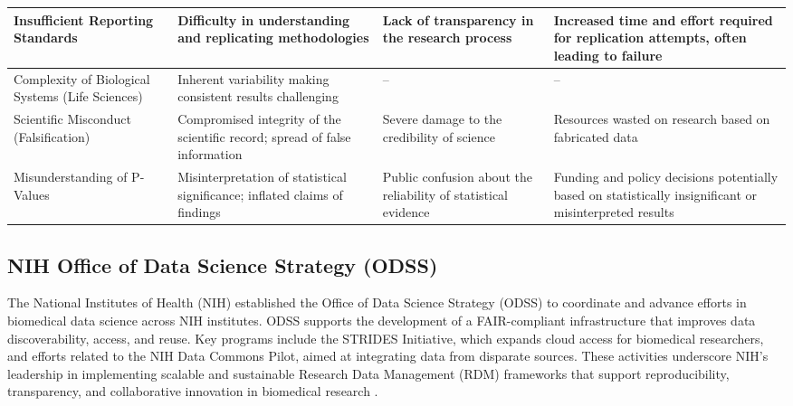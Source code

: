\begin{table}[ht]
\begin{tabularx}{\textwidth}{|X|X|X|X|}
        \hline
        Insufficient Reporting Standards                 & Difficulty in understanding and replicating methodologies                       & Lack of transparency in the research process                        & Increased time and effort required for replication attempts, often leading to failure                   \\
        \hline
        Complexity of Biological Systems (Life Sciences) & Inherent variability making consistent results challenging                      & --                                                                  & --                                                                                                      \\
        \hline
        Scientific Misconduct (Falsification)            & Compromised integrity of the scientific record; spread of false information     & Severe damage to the credibility of science                         & Resources wasted on research based on fabricated data                                                   \\
        \hline
        Misunderstanding of P-Values                     & Misinterpretation of statistical significance; inflated claims of findings      & Public confusion about the reliability of statistical evidence      & Funding and policy decisions potentially based on statistically insignificant or misinterpreted results \\
        \hline
    \end{tabularx}
\end{table}






\subsection{NIH Office of Data Science Strategy (ODSS)}

The National Institutes of Health (NIH) established the Office of Data Science Strategy (ODSS) to coordinate and advance efforts in biomedical data science across NIH institutes. ODSS supports the development of a FAIR-compliant infrastructure that improves data discoverability, access, and reuse. Key programs include the STRIDES Initiative, which expands cloud access for biomedical researchers, and efforts related to the NIH Data Commons Pilot, aimed at integrating data from disparate sources. These activities underscore NIH’s leadership in implementing scalable and sustainable Research Data Management (RDM) frameworks that support reproducibility, transparency, and collaborative innovation in biomedical research \cite{odss_nih}.

